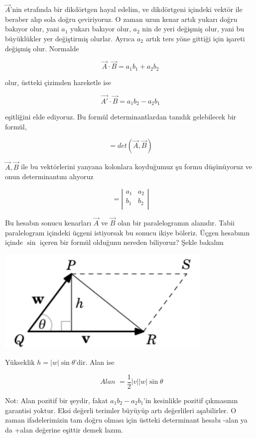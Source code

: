 \documentclass[12pt,fleqn]{article}\usepackage{../../common}
\begin{document}
$\vec{A}$'nin etrafında bir dikdörtgen hayal edelim, ve dikdörtgeni içindeki
vektör ile beraber alıp sola doğru çeviriyoruz. O zaman uzun kenar artık yukarı
doğru bakıyor olur, yani $a_1$ yukarı bakıyor olur, $a_2$ nin de yeri değişmiş
olur, yani bu büyüklükler yer değiştirmiş olurlar. Ayrıca $a_2$ artık ters yöne
gittiği için işareti değişmiş olur. Normalde

$$ \vec{A}\cdot\vec{B} = a_1b_1 + a_2b_2 $$

olur, üstteki çizimden hareketle ise

$$ \vec{A'} \cdot \vec{B} = a_1b_2 - a_2b_1 $$

eşitliğini elde ediyoruz. Bu formül determinantlardan tanıdık gelebilecek bir 
formül, 

$$ = det(\vec{A},\vec{B}) $$

$\vec{A},\vec{B}$ ile bu vektörlerini yanyana kolonlara koyduğumuz şu formu
düşünüyoruz ve onun determinantını alıyoruz

$$ =
\left|\begin{array}{rr}
a_1 & a_2 \\
b_1 & b_2 \\
\end{array}\right|
 $$

Bu hesabın sonucu kenarları $\vec{A}$ ve $\vec{B}$ olan bir paralelogramın
alanıdır.  Tabii paralelogram içindeki üçgeni istiyorsak bu sonucu ikiye
böleriz. Üçgen hesabının içinde $\sin$ içeren bir formül olduğunu nereden 
biliyoruz?
Şekle bakalım

\includegraphics[height=5cm]{triangle.png}

Yükseklik $h=|w|\sin\theta$'dir. Alan ise

$$ \textit{ Alan } = \frac{1}{2}|v||w|\sin\theta $$

Not: Alan pozitif bir şeydir, fakat $a_1b_2 - a_2b_1$'in kesinlikle pozitif
çıkmasının garantisi yoktur. Eksi değerli terimler büyüyüp artı değerlileri
aşabilirler. O zaman ifadelerimizin tam doğru olması için üstteki determinant
hesabı -alan ya da +alan değerine eşittir demek lazım.
\end{document}
